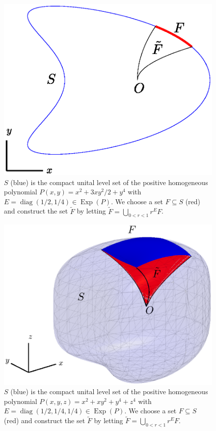 \documentclass[11pt]{article}
\theoremstyle{remark}
\newcommand\Exp{\operatorname{Exp}}
\newcommand\diag{\operatorname{diag}}
\begin{document}
\begin{figure}[!htb]
    \centering
    \includegraphics[scale=0.7, trim={1cm 1cm 1cm 0.5cm},clip]{level_set_F.eps}
    \caption{$S$ (blue) is the compact unital level set of the positive homogeneous polynomial $P(x,y) = x^2 + 3xy^2/2 + y^4$ with $E = \diag(1/2,1/4)\in \Exp(P)$. We choose a set $F\subseteq S$ (red) and construct the set $\widetilde{F}$ by letting $\widetilde{F} = \bigcup_{0<r<1} r^E F $. }
    \label{fig:level_set_F}
\end{figure}

\begin{figure}[!htb]
    \centering
    \includegraphics[scale=0.7, trim={1cm 3cm 1cm 2cm},clip]{level_set_F_3D.eps}
    \caption{$S$ (blue) is the compact unital level set of the positive homogeneous polynomial $P(x,y,z) = x^2 + xy^2 + y^4 + z^4$ with $E = \diag(1/2,1/4,1/4)\in \Exp(P)$. We choose a set $F\subseteq S$ (red) and construct the set $\widetilde{F}$ by letting $\widetilde{F} = \bigcup_{0<r<1} r^E F $. }
    \label{fig:level_set_F_3D}
\end{figure}
\end{document}
